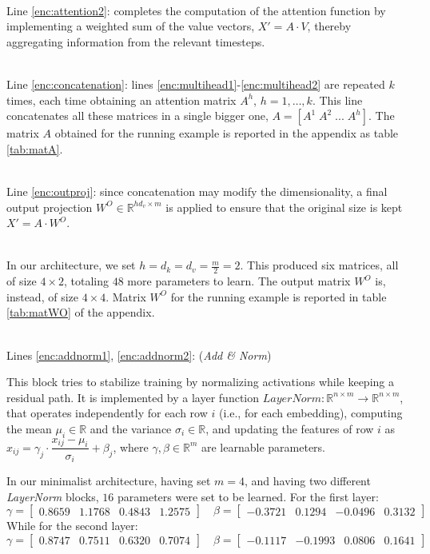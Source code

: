 \documentclass[algorithms,article,submit,pdftex,moreauthors]{Definitions/mdpi}
\begin{document}
~\\Line \ref{enc:attention2}: completes the computation of the attention function by implementing a weighted sum of the value vectors, $X' = A \cdot V$, thereby aggregating information from the relevant timesteps.

~\\Line \ref{enc:concatenation}: lines \ref{enc:multihead1}-\ref{enc:multihead2} are repeated $k$ times, each time obtaining an attention matrix $A^h$, $h=1,\dots,k$. This line concatenates all these matrices in a single bigger one, $A = [A^1\;A^2\;...\;A^h]$. The matrix $A$ obtained for the running example is reported in the appendix as table \ref{tab:matA}.

~\\Line \ref{enc:outproj}: since concatenation may modify the dimensionality, a final output projection $W^O \in \mathbb{R}^{hd_v \times m}$ is applied to ensure that the original size is kept $X' = A \cdot W^O$. 

~\\In our architecture, we set $h = d_k = d_v = \frac{m}{2} = 2$. This produced six matrices, all of size $4 \times 2$, totaling $48$ more parameters to learn. The output matrix $W^O$ is, instead, of size $4 \times 4$. Matrix $W^O$ for the running example is reported in table \ref{tab:matWO} of the appendix.

~\\Lines \ref{enc:addnorm1}, \ref{enc:addnorm2}: (\textit{Add \& Norm})

This block tries to stabilize training by normalizing activations while keeping a residual path. It is implemented by a layer function $LayerNorm : \mathbb{R}^{n \times m} \to \mathbb{R}^{n \times m}$, that operates independently for each row $i$ (i.e., for each embedding), computing the mean $\mu_i \in \mathbb{R}$ and the variance $\sigma_i \in \mathbb{R}$, and updating the features of row $i$ as $ x_{ij} = \gamma_j\cdot\dfrac{x_{ij} - \mu_i}{\sigma_i} + \beta_j$, 
where $\gamma,\beta \in \mathbb{R}^m$ are learnable parameters.

In our minimalist architecture, having set $m = 4$, and having two different \textit{LayerNorm} blocks, $16$ parameters were set to be learned. For the first layer:
$$
    \gamma =    \begin{bmatrix}
                    0.8659 & 1.1768 & 0.4843 & 1.2575
                \end{bmatrix} \quad
    \beta =     \begin{bmatrix}
                -0.3721 & 0.1294 & -0.0496 & 0.3132
                \end{bmatrix}
$$
While for the second layer:
$$
    \gamma =    \begin{bmatrix}
                    0.8747 & 0.7511 & 0.6320 & 0.7074
                \end{bmatrix} \quad
    \beta =     \begin{bmatrix}
                    -0.1117 & -0.1993 & 0.0806 & 0.1641
                \end{bmatrix}
$$
\end{document}
